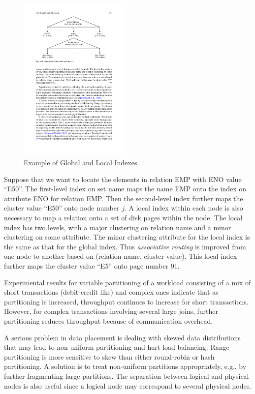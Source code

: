 \documentclass{vldb}
\begin{document}
\begin{figure}[htb]
\centering
\includegraphics[width=0.48\textwidth]{indexes}
\caption{Example of Global and Local Indexes.}
\label{fig:indexes}
\end{figure}

Suppose that we want to locate the elements in relation EMP with ENO value “E50”. The first-level index on set name maps the name EMP onto the index on attribute ENO for relation EMP. Then the second-level index further maps the cluster value “E50” onto node number $j$. A local index within each node is also necessary to map a relation onto a set of disk pages within the node. The local index has two levels, with a major clustering on relation name and a minor clustering on some attribute. The minor clustering attribute for the local index is the same as that for the global index. Thus \textit{associative routing} is improved from one node to another based on (relation name, cluster value). This local index further maps the cluster value “E5” onto page number 91.

Experimental results for variable partitioning of a workload consisting of a mix of short transactions (debit-credit like) and complex ones indicate that as partitioning is increased, throughput continues to increase for short transactions. However, for complex transactions involving several large joins, further partitioning reduces throughput because of communication overhead.

A serious problem in data placement is dealing with skewed data distributions that may lead to non-uniform partitioning and hurt load balancing. Range partitioning is more sensitive to skew than either round-robin or hash partitioning. A solution is to treat non-uniform partitions appropriately, e.g., by further fragmenting large partitions. The separation between logical and physical nodes is also useful since a logical node may correspond to several physical nodes.
\end{document}
